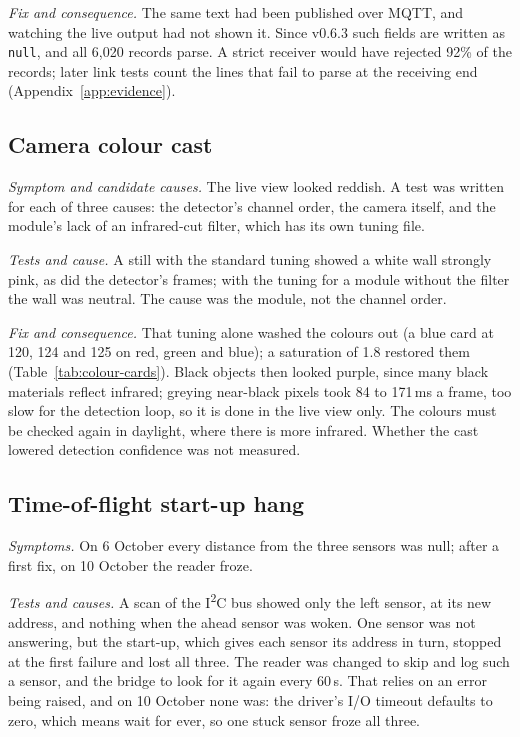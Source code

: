 \emph{Fix and consequence.} The same text had been published over MQTT, and watching the live output had not shown it. Since v0.6.3 such fields are written as \texttt{null}, and all 6,020 records parse. A strict receiver would have rejected 92\% of the records; later link tests count the lines that fail to parse at the receiving end (Appendix~\ref{app:evidence}).

\subsection{Camera colour cast}
\label{sec:inv-colour}

\emph{Symptom and candidate causes.} The live view looked reddish. A test was written for each of three causes: the detector's channel order, the camera itself, and the module's lack of an infrared-cut filter, which has its own tuning file.

\emph{Tests and cause.} A still with the standard tuning showed a white wall strongly pink, as did the detector's frames; with the tuning for a module without the filter the wall was neutral. The cause was the module, not the channel order.

\emph{Fix and consequence.} That tuning alone washed the colours out (a blue card at 120, 124 and 125 on red, green and blue); a saturation of 1.8 restored them (Table~\ref{tab:colour-cards}). Black objects then looked purple, since many black materials reflect infrared; greying near-black pixels took 84 to 171\,ms a frame, too slow for the detection loop, so it is done in the live view only. The colours must be checked again in daylight, where there is more infrared. Whether the cast lowered detection confidence was not measured.

\subsection{Time-of-flight start-up hang}
\label{sec:inv-tof}

\emph{Symptoms.} On 6 October every distance from the three sensors was null; after a first fix, on 10 October the reader froze.

\emph{Tests and causes.} A scan of the I\textsuperscript{2}C bus showed only the left sensor, at its new address, and nothing when the ahead sensor was woken. One sensor was not answering, but the start-up, which gives each sensor its address in turn, stopped at the first failure and lost all three. The reader was changed to skip and log such a sensor, and the bridge to look for it again every 60\,s. That relies on an error being raised, and on 10 October none was: the driver's I/O timeout defaults to zero, which means wait for ever, so one stuck sensor froze all three.

